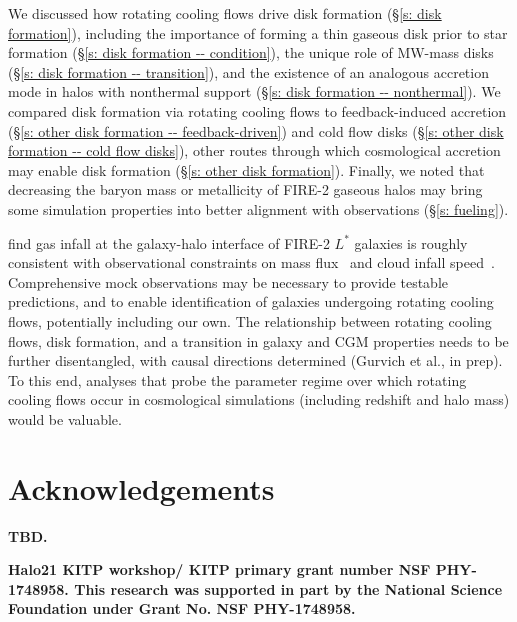 \documentclass[fleqn,usenatbib]{mnras}
\begin{document}
We discussed how rotating cooling flows drive disk formation (\S\ref{s: disk formation}), including the importance of forming a thin gaseous disk prior to star formation (\S\ref{s: disk formation -- condition}), the unique role of MW-mass disks (\S\ref{s: disk formation -- transition}), and the existence of an analogous accretion mode in halos with nonthermal support (\S\ref{s: disk formation -- nonthermal}).
We compared disk formation via rotating cooling flows to feedback-induced accretion (\S\ref{s: other disk formation -- feedback-driven}) and cold flow disks (\S\ref{s: other disk formation -- cold flow disks}), other routes through which cosmological accretion may enable disk formation (\S\ref{s: other disk formation}).
Finally, we noted that decreasing the baryon mass or metallicity of FIRE-2 gaseous halos may bring some simulation properties into better alignment with observations (\S\ref{s: fueling}).

\cite{Trapp2021} find gas infall at the galaxy-halo interface of FIRE-2 $L^*$ galaxies is roughly consistent with observational constraints on mass flux~\citep[e.g.][]{Putman2012, Rohser2016} and cloud infall speed~\citep[e.g.][]{Zheng2017, Werk2019, Bish2019, Ho2020}.
Comprehensive mock observations may be necessary to provide testable predictions, and to enable identification of galaxies undergoing rotating cooling flows, potentially including our own.
The relationship between rotating cooling flows, disk formation, and a transition in galaxy and CGM properties needs to be further disentangled, with causal directions determined (Gurvich et al., in prep).
To this end, analyses that probe the parameter regime over which rotating cooling flows occur in cosmological simulations (including redshift and halo mass) would be valuable.

\section*{Acknowledgements}

\textbf{TBD.}

\textbf{Halo21 KITP workshop/ KITP primary grant number NSF PHY-1748958.
This research was supported in part by the National Science Foundation under Grant No. NSF PHY-1748958.
}




\end{document}
